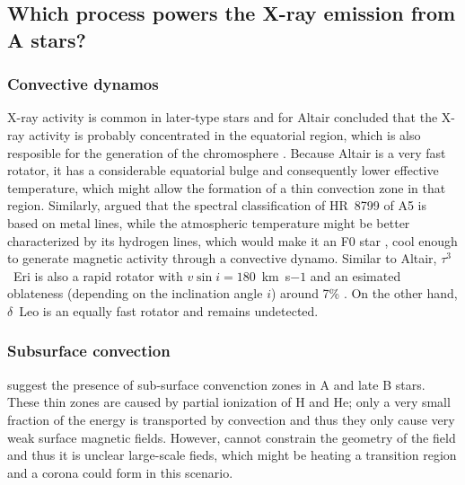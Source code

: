 \documentclass[preprint2]{aastex631}
\begin{document}
\subsection{Which process powers the X-ray emission from A stars?}
\subsubsection{Convective dynamos}
X-ray activity is common in later-type stars and for Altair
\citet{2009A&A...497..511R} concluded that the X-ray activity is
probably concentrated in the equatorial region, which is also
resposible for the generation of the chromosphere
\citep{1995ApJ...439.1011F}. Because Altair is a very fast rotator, it
has a considerable equatorial bulge and consequently lower effective
temperature, which might allow the formation of a thin convection zone
in that region. Similarly, \citet{2010A&A...516A..38R} argued that the
spectral classification of HR~8799 of A5 is based on metal lines,
while the atmospheric temperature might be better characterized by its
hydrogen lines, which would make it an F0 star
\citep{1999AJ....118.2993G}, cool enough to generate magnetic activity
through a convective dynamo. Similar to Altair, $\tau^3$~Eri is also a
rapid rotator with $v\sin i=180$~km~s${-1}$ and an esimated oblateness
(depending on the inclination angle $i$) around 7\%
\citep{2012A&ARv..20...51V}. On the other hand, $\delta$~Leo is an
equally fast rotator and remains undetected.

\subsubsection{Subsurface convection}
\citet{2019ApJ...883..106C} suggest the presence of sub-surface
convenction zones in A and late B stars. These thin zones are caused
by partial ionization of H and He; only a very small fraction of the
energy is transported by convection and thus they only cause very weak
surface magnetic fields. However, \citet{2019ApJ...883..106C} cannot
constrain the geometry of the field and thus it is unclear large-scale
fieds, which might be heating a transition region and a corona could
form in this scenario.
\end{document}
